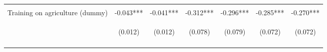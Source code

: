 \begin{center}
\begin{tabular}{lcccccc}
\vspace{4pt} & \begin{footnotesize}[0.000]\end{footnotesize} & \begin{footnotesize}[0.000]\end{footnotesize} & \begin{footnotesize}[0.001]\end{footnotesize} & \begin{footnotesize}[0.001]\end{footnotesize} & \begin{footnotesize}[0.001]\end{footnotesize} & \begin{footnotesize}[0.001]\end{footnotesize} \\
Training on agriculture (dummy) & -0.043*** & -0.041*** & -0.312*** & -0.296*** & -0.285*** & -0.270*** \\
 & \begin{footnotesize}(0.012)\end{footnotesize} & \begin{footnotesize}(0.012)\end{footnotesize} & \begin{footnotesize}(0.078)\end{footnotesize} & \begin{footnotesize}(0.079)\end{footnotesize} & \begin{footnotesize}(0.072)\end{footnotesize} & \begin{footnotesize}(0.072)\end{footnotesize} \\
\vspace{4pt} & \begin{footnotesize}[0.000]\end{footnotesize} & \begin{footnotesize}[0.000]\end{footnotesize} & \begin{footnotesize}[0.000]\end{footnotesize} & \begin{footnotesize}[0.000]\end{footnotesize} & \begin{footnotesize}[0.000]\end{footnotesize} & \begin{footnotesize}[0.000]\end{footnotesize} \\

\end{tabular}
\end{center}
